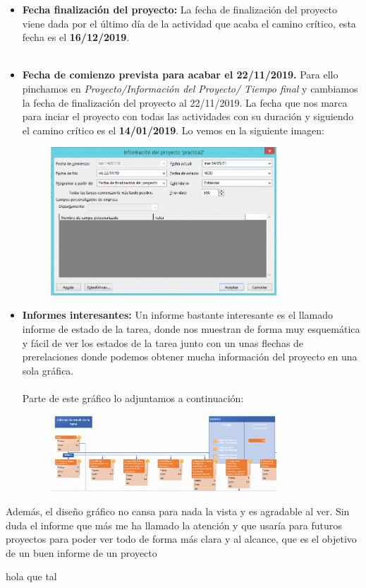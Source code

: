 \documentclass[11pt,letterpaper,onecolumn]{article}
\begin{document}
\begin{itemize}
\item{\textbf{Fecha finalización del proyecto:}} La fecha de finalización del proyecto viene dada por el último día de la actividad que acaba el camino crítico, esta fecha es el \textbf{16/12/2019}. \\
\\
\item{\textbf{Fecha de comienzo prevista para acabar el 22/11/2019.}} Para ello pinchamos en \textit{Proyecto/Información del Proyecto/ Tiempo final} y cambiamos la fecha de finalización del proyecto al 22/11/2019. La fecha que nos marca para inciar el proyecto con todas las actividades con su duración y siguiendo el camino crítico es el \textbf{14/01/2019}. Lo vemos en la siguiente imagen:
    \begin{figure}[H]
        \centering
        \includegraphics[width=0.8\textwidth]{g.png}
        \label{fig:g-png}
    \end{figure}

\item{\textbf{Informes interesantes:}}
    Un informe bastante interesante es el llamado informe de estado de la tarea, donde nos muestran de forma muy esquemática y fácil de ver los estados de la tarea junto con un unas flechas de prerelaciones donde podemos obtener mucha información del proyecto en una sola gráfica.\\
\\
Parte de este gráfico lo adjuntamos a continuación:
\begin{figure}[H]
    \centering
    \includegraphics[width=0.8\textwidth]{informegrafico.png}
    \label{fig:}
\end{figure}
\end{itemize}
Además, el diseño gráfico no cansa para nada la vista y es agradable al ver. Sin duda el informe que más me ha llamado la atención y que usaría para futuros proyectos para poder ver todo de forma más clara y al alcance, que es el objetivo de un buen informe de un proyecto 

hola que tal
\end{document}
